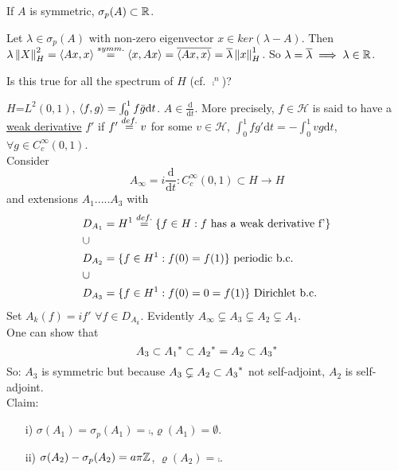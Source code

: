 \begin{lemma}\nl
	If $A$ is symmetric, $\sigma_p(A)\subset\mathbb{R}$.
	\begin{pf}{}{}
		Let $\lambda\in\sigma_p(A)$ with non-zero eigenvector $x\in ker(\lambda-A)$. Then $\lambda\left\|{X}\right\|_H^2=\left<{Ax},{x}\right>\stackrel{symm.}{=}\left<{x},{Ax}\right>=\overline{\left<{Ax},{x}\right>}=\overline{\lambda}\left\|{x}\right\|_H^1$. So $\lambda=\overline{\lambda}\implies \lambda\in\mathbb{R}$.
	\end{pf}
\end{lemma}
Is this true for all the spectrum of $H$ (cf. $\comp^n$)?
\begin{example}\nl
	$H$=$L^2(0,1)$, $\left<{f},{g}\right>=\int_0^1f\bar{g} \mathrm{d}t$. $A\in\frac{\mathrm{d}}{\mathrm{d}t}$. More precisely, $f\in\mathcal{H}$ is said to have a \underline{weak derivative} $f'$ if $f'\stackrel{def.}{=}{v}$ for some $v\in \mathcal{H}$, $\int_0^1 fg'\mathrm{d}t=-\int_0^1 vg\mathrm{d}t$, $\forall g\in C^\infty_c(0,1)$.\\
	Consider
	$$
		A_\infty =i\frac{\mathrm{d}}{\mathrm{d}t}:C^\infty_c(0,1)\subset H\to H
	$$
	and extensions $A_1$.....$A_3$ with
	\begin{equation}
		\begin{aligned}
			 & D_{A_1}=H^1\stackrel{def.}{=}\{f\in H: f \text{ has a weak derivative  f'}\} \\
			 & \cup                                                             \\
			 & D_{A_2}=\{f\in H^1:f(0)=f(1)\}\text{ periodic b.c.}              \\
			 & \cup                                                             \\
			 & D_{A_3}=\{f\in H^1: f(0)=0=f(1)\}\text{ Dirichlet b.c.}          \\
		\end{aligned}
	\end{equation}
	Set $A_k(f)=if'\,\,\forall f\in D_{A_k}$. Evidently $ A_\infty\subsetneq A_3\subsetneq A_2 \subsetneq A_1$.\\
	One can show that
	$$
		A_3\subset{A_1}^*\subset{A_2}^*=A_2\subset{A_3}^*
	$$
	So: $A_3$ is symmetric but because $A_3\subsetneq A_2\subset {A_3}^*$ not self-adjoint, $A_2$ is self-adjoint.\\
	Claim:
	\begin{itemize}
		\item [i)] $\sigma(A_1)=\sigma_p(A_1)=\comp$,$ \varrho(A_1)=\emptyset$.
		\item [ii)] $\sigma(A_2)-\sigma_p(A_2)=a\pi\mathbb{Z}$, $\varrho(A_2)=\comp$.

\end{itemize}
\end{example}
